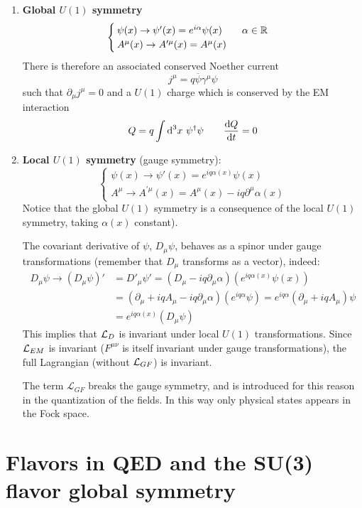 \documentclass[TheoreticalPhy_ModB.tex]{subfiles}
\begin{document}
\begin{enumerate}[label=$\bullet$]
\item \textbf{Global $U(1)$ symmetry}
\[
\begin{cases}
\psi(x) \to \psi'(x) = e^{i \alpha}\psi(x) \qquad \alpha \in \mathbb{R} \\
A^{\mu}(x) \to A^{\prime \mu}(x) = A^{\mu}(x)
\end{cases}
\]
There is therefore an associated conserved Noether current
\[
j^{\mu} = q \overline{\psi} \gamma^{\mu} \psi
\]
such that $\partial_{\mu}j^{\mu} = 0 $ and a $U(1)$ charge which is conserved by the EM interaction
\[
Q = q \int \textup{d}^3 x \ \psi^{\dagger} \psi
\qquad
\frac{\textup{d} Q}{\textup{d} t} = 0
\]
\item \textbf{Local $U(1)$ symmetry} (gauge symmetry):
\[
\begin{cases}
\psi(x) \to \psi'(x) = e^{iq\alpha(x)} \psi(x) \\
A^{\mu} \to A^{\prime \mu}(x) = A^{\mu}(x) - iq\partial^{\mu}\alpha(x)
\end{cases}
\]
Notice that the global $U(1)$ symmetry is a consequence of the local $U(1)$ symmetry, taking $\alpha(x)$ constant).

The covariant derivative of $\psi$, $D_{\mu}\psi$, behaves as a spinor under gauge transformations (remember that $D_{\mu}$ transforms as a vector), indeed:
\[
\begin{split}
D_{\mu}\psi \to (D_{\mu}\psi)' &= D'_{\mu}\psi'	 = (D_{\mu} - iq\partial_{\mu} \alpha)(e^{iq\alpha(x)} \psi(x)) \\
	& = (\partial_{\mu} + iqA_{\mu} - iq\partial_{\mu}\alpha)(e^{iq\alpha} \psi) 
	 = e^{iq\alpha}(\partial_{\mu} + iqA_{\mu})\psi \\
	& = e^{iq\alpha(x)}(D_{\mu}\psi)
\end{split}
\]
This implies that $\mathcal{L}_D$ is invariant under local $U(1)$ transformations. Since $\mathcal{L}_{EM}$ is invariant ($F^{\mu\nu}$ is itself invariant under gauge transformations), the full Lagrangian (without $\mathcal{L}_{GF}$) is invariant. 

The term $\mathcal{L}_{GF}$ breaks the gauge symmetry, and is introduced for this reason in the quantization of the fields. In this way only physical states appears in the Fock space.
\end{enumerate}

\section{Flavors in QED and the SU(3) flavor global symmetry}
\end{document}
